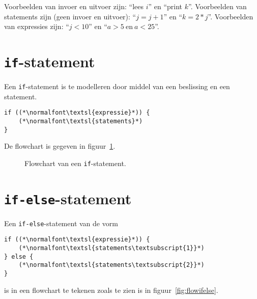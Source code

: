 Voorbeelden van invoer en uitvoer zijn: ``lees $i$'' en ``print $k$''. Voorbeelden
van statements zijn (geen invoer en uitvoer): ``$j = j+1$'' en ``$k=2*j$''.
Voorbeelden van expressies zijn: ``$j<10$'' en ``$a>5 \mathrm{\ en\ } a<25$''.


\section{\texttt{if}-statement}
Een \texttt{if}-statement is te modelleren door middel van een beslissing en een statement.

\begin{lstlisting}[caption=\texttt{if}-statement in C]
if ((*\normalfont\textsl{expressie}*)) {
    (*\normalfont\textsl{statements}*)
}
\end{lstlisting}

De flowchart is gegeven in figuur~\ref{fig:flowif}.

\begin{figure}[!ht]
\centering
{}
\caption{Flowchart van een \texttt{if}-statement.}
\label{fig:flowif}
\end{figure}


\section{\texttt{if-else}-statement}

Een \texttt{if-else}-statement van de vorm

\begin{lstlisting}[caption=\texttt{if-else}-statement in C.]
if ((*\normalfont\textsl{expressie}*)) {
    (*\normalfont\textsl{statements\textsubscript{1}}*)
} else {
    (*\normalfont\textsl{statements\textsubscript{2}}*)
}
\end{lstlisting}

is in een flowchart te tekenen zoals te zien is in figuur~\ref{fig:flowifelse}.

